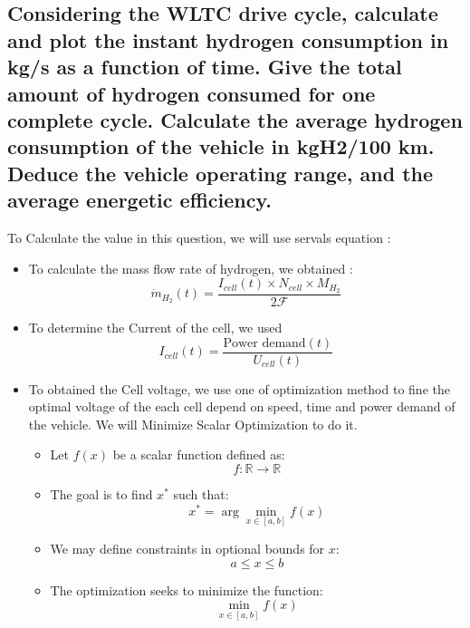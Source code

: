 \documentclass[12pt,a4paper]{article}
\numberwithin{equation}{section}
\begin{document}
{\subsection{Considering the WLTC drive cycle, calculate and plot the instant hydrogen consumption in kg/s
as a function of time. Give the total amount of hydrogen consumed for one complete cycle. 
Calculate the average hydrogen consumption of the vehicle in kgH2/100 km. Deduce the vehicle 
operating range, and the average energetic efficiency.
}

To Calculate the value in this question, we will use servals equation :

\begin{itemize}
	\item To calculate the mass flow rate of hydrogen, we obtained :
	\begin{equation}
		\dot{m}_{H_2}(t) = \frac{I_{cell}(t)\times N_{cell}\times M_{H_2}}{2\mathscr{F}}
	\end{equation}
	\item To determine the Current of the cell, we used
	\begin{equation}
		I_{cell}(t) = \frac{\text{Power demand} (t)}{U_{cell}(t)}
	\end{equation}
	\item To obtained the Cell voltage, we use one of optimization method to fine the optimal voltage of the each cell depend on speed, time and power demand of the vehicle. We will Minimize Scalar Optimization to do it.
\begin{itemize}
	\item Let \( f(x) \) be a scalar function defined as:
	\begin{equation}
		f: \mathbb{R} \to \mathbb{R}
	\end{equation}
	
	\item The goal is to find \( x^* \) such that:
	\begin{equation}
		x^* = \arg \min_{x \in [a, b]} f(x)
	\end{equation}
	
	\item We may define constraints in optional bounds for \( x \):
	\begin{equation}
		a \leq x \leq b
	\end{equation}
	
	\item The optimization seeks to minimize the function:
	\begin{equation}
		\min_{x \in [a, b]} f(x)
	\end{equation}
	

\end{itemize}
\end{itemize}}
\end{document}
